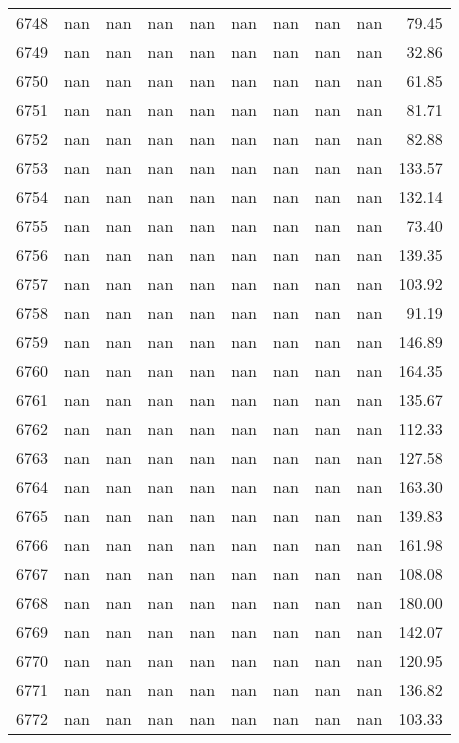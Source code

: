 \begin{tabular}{lrrrrrrrrr}
6748 & nan & nan & nan & nan & nan & nan & nan & nan & 79.45 \\
6749 & nan & nan & nan & nan & nan & nan & nan & nan & 32.86 \\
6750 & nan & nan & nan & nan & nan & nan & nan & nan & 61.85 \\
6751 & nan & nan & nan & nan & nan & nan & nan & nan & 81.71 \\
6752 & nan & nan & nan & nan & nan & nan & nan & nan & 82.88 \\
6753 & nan & nan & nan & nan & nan & nan & nan & nan & 133.57 \\
6754 & nan & nan & nan & nan & nan & nan & nan & nan & 132.14 \\
6755 & nan & nan & nan & nan & nan & nan & nan & nan & 73.40 \\
6756 & nan & nan & nan & nan & nan & nan & nan & nan & 139.35 \\
6757 & nan & nan & nan & nan & nan & nan & nan & nan & 103.92 \\
6758 & nan & nan & nan & nan & nan & nan & nan & nan & 91.19 \\
6759 & nan & nan & nan & nan & nan & nan & nan & nan & 146.89 \\
6760 & nan & nan & nan & nan & nan & nan & nan & nan & 164.35 \\
6761 & nan & nan & nan & nan & nan & nan & nan & nan & 135.67 \\
6762 & nan & nan & nan & nan & nan & nan & nan & nan & 112.33 \\
6763 & nan & nan & nan & nan & nan & nan & nan & nan & 127.58 \\
6764 & nan & nan & nan & nan & nan & nan & nan & nan & 163.30 \\
6765 & nan & nan & nan & nan & nan & nan & nan & nan & 139.83 \\
6766 & nan & nan & nan & nan & nan & nan & nan & nan & 161.98 \\
6767 & nan & nan & nan & nan & nan & nan & nan & nan & 108.08 \\
6768 & nan & nan & nan & nan & nan & nan & nan & nan & 180.00 \\
6769 & nan & nan & nan & nan & nan & nan & nan & nan & 142.07 \\
6770 & nan & nan & nan & nan & nan & nan & nan & nan & 120.95 \\
6771 & nan & nan & nan & nan & nan & nan & nan & nan & 136.82 \\
6772 & nan & nan & nan & nan & nan & nan & nan & nan & 103.33 \\

\end{tabular}
